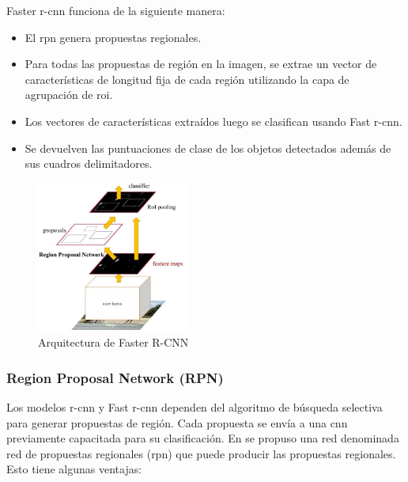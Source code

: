 Faster \gls{r-cnn} funciona de la siguiente manera:

\begin{itemize}
    \item El \gls{rpn} genera propuestas regionales.
    \item Para todas las propuestas de región en la imagen, se extrae un vector de características de longitud fija de cada región utilizando la capa de agrupación de \gls{roi}.
    \item Los vectores de características extraídos luego se clasifican usando Fast \gls{r-cnn}.
    \item Se devuelven las puntuaciones de clase de los objetos detectados además de sus cuadros delimitadores.
\end{itemize}

\begin{figure}[ht]
\centering
\includegraphics[width=0.45\textwidth]{img/chapters/estado-del-arte/arquitectura-faster-rcnn.jpg}
\caption{\label{fig:arquitectura-faster-rcnn}Arquitectura de Faster R-CNN \cite{ren2016faster}}
\end{figure}

\subsubsection*{Region Proposal Network (RPN)}
\label{subsubsec:region-proposal-network}

Los modelos \gls{r-cnn} y Fast \gls{r-cnn} dependen del algoritmo de búsqueda selectiva para generar propuestas de región. Cada propuesta se envía a una \gls{cnn} previamente capacitada para su clasificación. En \cite{ren2016faster} se propuso una red denominada red de propuestas regionales (\gls{rpn}) que puede producir las propuestas regionales. Esto tiene algunas ventajas:


